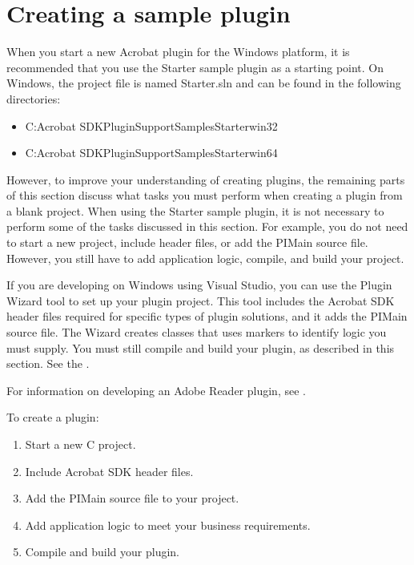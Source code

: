 \documentclass[letterpaper,12pt,english,openany,oneside]{sphinxmanual}
\begin{document}
\section{Creating a sample plugin}
\label{\detokenize{Plugins_CreatingSimplePlug:creating-a-sample-plugin}}
When you start a new Acrobat plugin for the Windows platform, it is recommended that you use the Starter sample plugin as a starting point. On Windows, the project file is named Starter.sln and can be found in the following directories:
\begin{itemize}
\item {} 
C:Acrobat SDKPluginSupportSamplesStarterwin32

\item {} 
C:Acrobat SDKPluginSupportSamplesStarterwin64

\end{itemize}

However, to improve your understanding of creating plugins, the remaining parts of this section discuss what tasks you must perform when creating a plugin from a blank project. When using the Starter sample plugin, it is not necessary to perform some of the tasks discussed in this section. For example, you do not need to start a new project, include header files, or add the PIMain source file. However, you still have to add application logic, compile, and build your project.

If you are developing on Windows using Visual Studio, you can use the Plugin Wizard tool to set up your plugin project. This tool includes the Acrobat SDK header files required for specific types of plugin solutions, and it adds the PIMain source file. The Wizard creates classes that uses  markers to identify logic you must supply. You must still compile and build your plugin, as described in this section. See the .

For information on developing an Adobe Reader plugin, see .

To create a plugin:
\begin{enumerate}
%
\item {} 
Start a new C project.

\item {} 
Include Acrobat SDK header files.

\item {} 
Add the PIMain source file to your project.

\item {} 
Add application logic to meet your business requirements.

\item {} 
Compile and build your plugin.

\end{enumerate}
\end{document}
